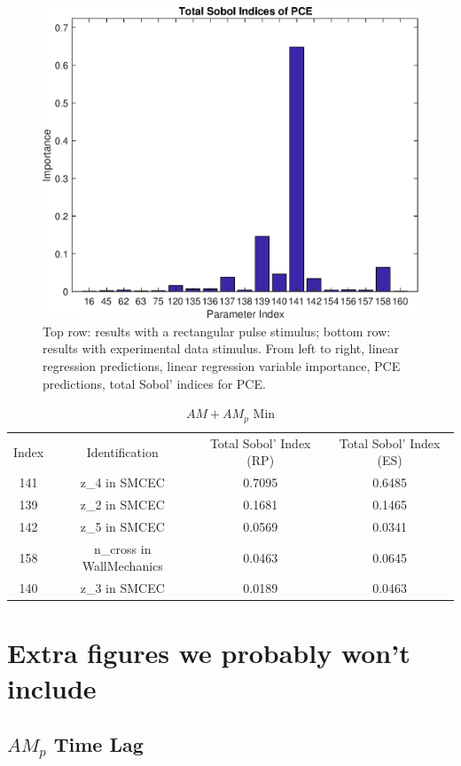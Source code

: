 \documentclass[12pt]{article}
\numberwithin{equation}{section}
\begin{document}
\begin{figure}[h]
\includegraphics[width=.24 \textwidth]{Figures/AM_AMp_Min_QoI_PCE_SI_Experimental.eps}
\caption{Top row: results with a rectangular pulse stimulus; bottom row: results with experimental data stimulus. From left to right, linear regression predictions, linear regression variable importance, PCE predictions, total Sobol' indices for PCE.}
\vspace{-.5 cm}
\end{figure}

\begin{table}[h]
\centering
\begin{tabular}{cccc}
Index & Identification & Total Sobol' Index (RP) & Total Sobol' Index (ES)\\
141 & z\_4 in SMCEC & 0.7095 & 0.6485\\
139 &  z\_2 in SMCEC & 0.1681 & 0.1465\\
142 & z\_5 in SMCEC & 0.0569 & 0.0341\\
158 & n\_cross in WallMechanics & 0.0463 & 0.0645\\
140 & z\_3 in SMCEC & 0.0189 & 0.0463\\
\end{tabular}
\caption{$AM+AM_p$ Min}
\vspace{-1.5 cm}
\label{qoi_AM_AMp_Min}
\end{table}

\newpage
\section{Extra figures we probably won't include}
\subsection{$AM_p$ Time Lag}
\end{document}
